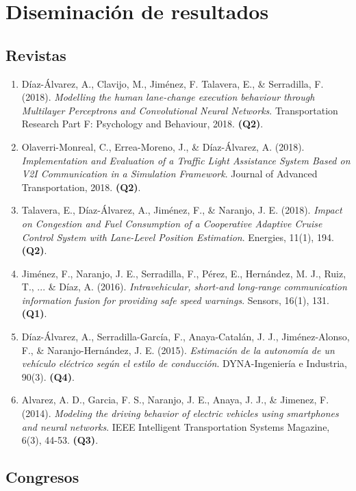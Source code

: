 \section{Diseminación de resultados}

\subsection{Revistas}

\begin{enumerate}
	\item Díaz-Álvarez, A., Clavijo, M., Jiménez, F. Talavera, E., \& Serradilla, F. (2018). \textit{Modelling the human lane-change execution behaviour through Multilayer Perceptrons and Convolutional Neural Networks}. Transportation Research Part F: Psychology and Behaviour, 2018. \textbf{(Q2)}.
	\item Olaverri-Monreal, C., Errea-Moreno, J., \& Díaz-Álvarez, A. (2018). \textit{Implementation and Evaluation of a Traffic Light Assistance System Based on V2I Communication in a Simulation Framework}. Journal of Advanced Transportation, 2018. \textbf{(Q2)}.
	\item Talavera, E., Díaz-Álvarez, A., Jiménez, F., \& Naranjo, J. E. (2018). \textit{Impact on Congestion and Fuel Consumption of a Cooperative Adaptive Cruise Control System with Lane-Level Position Estimation}. Energies, 11(1), 194. \textbf{(Q2)}.
	\item Jiménez, F., Naranjo, J. E., Serradilla, F., Pérez, E., Hernández, M. J., Ruiz, T., ... \& Díaz, A. (2016). \textit{Intravehicular, short-and long-range communication information fusion for providing safe speed warnings}. Sensors, 16(1), 131. \textbf{(Q1)}.
	\item Díaz-Álvarez, A., Serradilla-García, F., Anaya-Catalán, J. J., Jiménez-Alonso, F., \& Naranjo-Hernández, J. E. (2015). \textit{Estimación de la autonomía de un vehículo eléctrico según el estilo de conducción}. DYNA-Ingeniería e Industria, 90(3). \textbf{(Q4)}.
	\item Alvarez, A. D., Garcia, F. S., Naranjo, J. E., Anaya, J. J., \& Jimenez, F. (2014). \textit{Modeling the driving behavior of electric vehicles using smartphones and neural networks}. IEEE Intelligent Transportation Systems Magazine, 6(3), 44-53. \textbf{(Q3)}.
\end{enumerate}

\subsection{Congresos}

